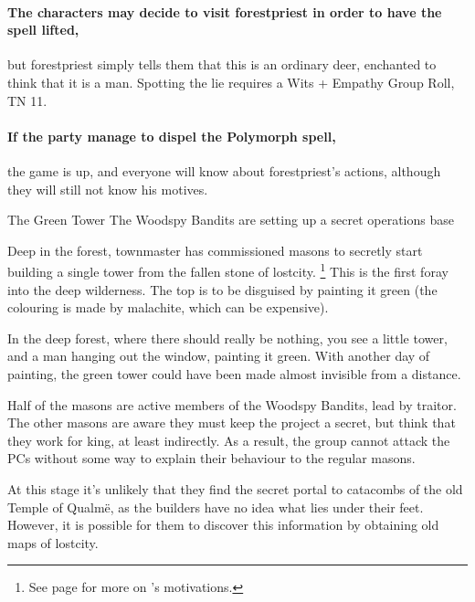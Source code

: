 \begin{multicols}{2}
\paragraph{The characters may decide to visit \gls{forestpriest} in order to have the spell lifted,}
but \gls{forestpriest} simply tells them that this is an ordinary deer, enchanted to think that it is a man.
Spotting the lie requires a Wits + Empathy Group Roll, TN 11.

\paragraph{If the party manage to dispel the Polymorph spell,}
the game is up, and everyone will know about \gls{forestpriest}'s actions, although they will still not know his motives.

{The Green Tower}%
{The Woodspy Bandits are setting up a secret operations base}%

Deep in the forest, \gls{townmaster} has commissioned masons to secretly start building a single tower from the fallen stone of \gls{lostcity}.
\footnote{See page \pageref{expanding_wilderness} for more on 's motivations.}
This is the first foray into the deep wilderness.
The top is to be disguised by painting it green (the colouring is made by malachite, which can be expensive).

\begin{boxtext}

	In the deep forest, where there should really be nothing, you see a little tower, and a man hanging out the window, painting it green.
	With another day of painting, the green tower could have been made almost invisible from a distance.

\end{boxtext}

Half of the masons are active members of the Woodspy Bandits, lead by \gls{traitor}.
The other masons are aware they must keep the project a secret, but think that they work for \gls{king}, at least indirectly.
As a result, the group cannot attack the PCs without some way to explain their behaviour to the regular masons.

At this stage it's unlikely that they find the secret portal to catacombs of the old Temple of Qualm\"{e}, as the builders have no idea what lies under their feet.
However, it is possible for them to discover this information by obtaining old maps of \gls{lostcity}.


\end{multicols}
